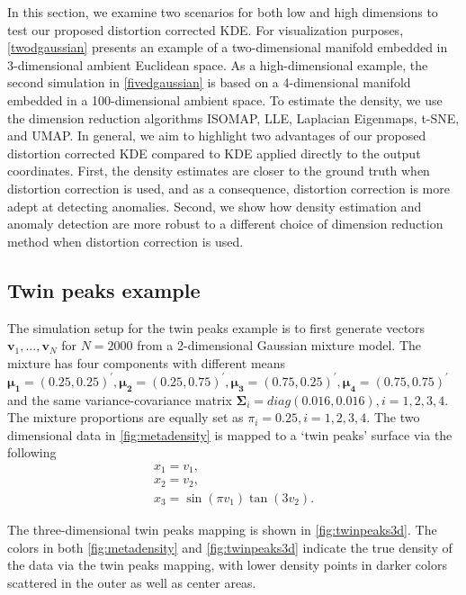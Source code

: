 \documentclass[11pt,a4paper,]{article}
\begin{document}
In this section, we examine two scenarios for both low and high dimensions to test our proposed distortion corrected KDE. For visualization purposes, \autoref{twodgaussian} presents an example of a two-dimensional manifold embedded in 3-dimensional ambient Euclidean space. As a high-dimensional example, the second simulation in \autoref{fivedgaussian} is based on a 4-dimensional manifold embedded in a 100-dimensional ambient space. To estimate the density, we use the dimension reduction algorithms ISOMAP, LLE, Laplacian Eigenmaps, t-SNE, and UMAP. In general, we aim to highlight two advantages of our proposed distortion corrected KDE compared to KDE applied directly to the output coordinates. First, the density estimates are closer to the ground truth when distortion correction is used, and as a consequence, distortion correction is more adept at detecting anomalies. Second, we show how density estimation and anomaly detection are more robust to a different choice of dimension reduction method when distortion correction is used.

\hypertarget{twodgaussian}{%
\subsection{Twin peaks example}\label{twodgaussian}}

The simulation setup for the twin peaks example is to first generate vectors \(\pmb{v}_1,\dots,\pmb{v}_N\) for \(N=2000\) from a 2-dimensional Gaussian mixture model. The mixture has four components with different means
\(\pmb{\mu_1}=(0.25, 0.25)^\prime, \pmb{\mu_2}=(0.25, 0.75)^\prime, \pmb{\mu_3}=(0.75, 0.25)^\prime, \pmb{\mu_4}=(0.75, 0.75)^\prime\) and the same variance-covariance matrix \(\pmb{\Sigma}_i=diag(0.016, 0.016), i=1,2,3,4\). The mixture proportions
are equally set as \(\pi_i=0.25, i=1,2,3,4\). The two dimensional data in \autoref{fig:metadensity} is mapped to a `twin peaks' surface via the following
\begin{equation}
\label{eq:twinpeak}
\begin{array}{lcl}
x_1 = v_1, \\
x_2 = v_2, \\
x_3 = \sin(\pi v_1) \tan (3 v_2).
\end{array}
\end{equation}

The three-dimensional twin peaks mapping is shown in \autoref{fig:twinpeaks3d}. The colors in both \autoref{fig:metadensity} and \autoref{fig:twinpeaks3d} indicate the true density of the data via the twin peaks mapping, with lower density points in darker colors scattered in the outer as well as center areas.
\end{document}
